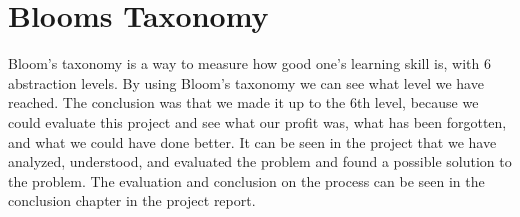 \section{Blooms Taxonomy}
Bloom's taxonomy is a way to measure how good one's learning skill is, with 6 abstraction levels.
By using Bloom's taxonomy we can see what level we have reached. The conclusion was that we made it up to the 6th level, because we could evaluate this project and see what our profit was, what has been forgotten, and what we could have done better. It can be seen in the project that we have analyzed, understood, and evaluated the problem and found a possible solution to the problem. The evaluation and conclusion on the process can be seen in the conclusion chapter in the project report.